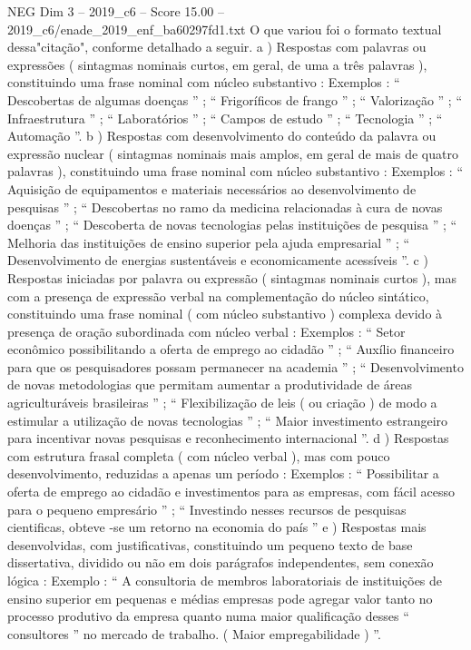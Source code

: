 \begin{textsample}{NEG Dim 3 – 2019\_c6 – Score 15.00 – 2019\_c6/enade\_2019\_enf\_ba60297fd1.txt}
O que variou foi o formato textual dessa"citação", conforme detalhado a seguir. a ) Respostas com palavras ou expressões ( sintagmas nominais curtos, em geral, de uma a três palavras ), constituindo uma frase nominal com núcleo substantivo : Exemplos : “ Descobertas de algumas doenças ” ; “ Frigoríficos de frango ” ; “ Valorização ” ; “ Infraestrutura ” ; “ Laboratórios ” ; “ Campos de estudo ” ; “ Tecnologia ” ; “ Automação ”. b ) Respostas com desenvolvimento do conteúdo da palavra ou expressão nuclear ( sintagmas nominais mais amplos, em geral de mais de quatro palavras ), constituindo uma frase nominal com núcleo substantivo : Exemplos : “ Aquisição de equipamentos e materiais necessários ao desenvolvimento de pesquisas ” ; “ Descobertas no ramo da medicina relacionadas à cura de novas doenças ” ; “ Descoberta de novas tecnologias pelas instituições de pesquisa ” ; “ Melhoria das instituições de ensino superior pela ajuda empresarial ” ; “ Desenvolvimento de energias sustentáveis e economicamente acessíveis ”. c ) Respostas iniciadas por palavra ou expressão ( sintagmas nominais curtos ), mas com a presença de expressão verbal na complementação do núcleo sintático, constituindo uma frase nominal ( com núcleo substantivo ) complexa devido à presença de oração subordinada com núcleo verbal : Exemplos : “ Setor econômico possibilitando a oferta de emprego ao cidadão ” ; “ Auxílio financeiro para que os pesquisadores possam permanecer na academia ” ; “ Desenvolvimento de novas metodologias que permitam aumentar a produtividade de áreas agriculturáveis brasileiras ” ; “ Flexibilização de leis ( ou criação ) de modo a estimular a utilização de novas tecnologias ” ; “ Maior investimento estrangeiro para incentivar novas pesquisas e reconhecimento internacional ”. d ) Respostas com estrutura frasal completa ( com núcleo verbal ), mas com pouco desenvolvimento, reduzidas a apenas um período : Exemplos : “ Possibilitar a oferta de emprego ao cidadão e investimentos para as empresas, com fácil acesso para o pequeno empresário ” ; “ Investindo nesses recursos de pesquisas cientificas, obteve -se um retorno na economia do país ” e ) Respostas mais desenvolvidas, com justificativas, constituindo um pequeno texto de base dissertativa, dividido ou não em dois parágrafos independentes, sem conexão lógica : Exemplo : “ A consultoria de membros laboratoriais de instituições de ensino superior em pequenas e médias empresas pode agregar valor tanto no processo produtivo da empresa quanto numa maior qualificação desses “ consultores ” no mercado de trabalho. ( Maior empregabilidade ) ”.

\end{textsample}
